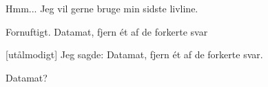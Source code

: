 \documentclass[a4paper,11pt]{article}
\begin{document}
\begin{sketch}
 Hmm... Jeg vil gerne bruge min sidste livline.

 Fornuftigt.  Datamat, fjern ét af de forkerte svar


[utålmodigt] Jeg sagde: Datamat, fjern ét af de forkerte svar.


 Datamat?









\end{sketch}
\end{document}
